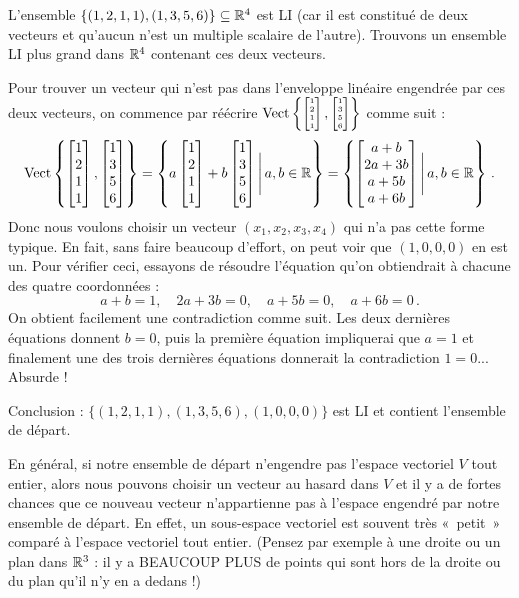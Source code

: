\begin{myexample} L'ensemble $\{(1,2,1,1), (1,3,5,6)\}\subseteq \mathbb{R}^4$ est LI (car il est constitué de deux vecteurs et qu'aucun n'est un multiple scalaire de l'autre).  Trouvons 
un ensemble LI plus grand dans $\mathbb{R}^4$ contenant ces deux vecteurs.

Pour trouver un vecteur qui n'est pas dans l'enveloppe lin\'eaire engendr\'ee par ces deux vecteurs, on commence par r\'e\'ecrire $\textrm{Vect}\tiny\left\{ \left[ \begin{matrix} 1\\2\\1\\1 \end{matrix} \right], \left[ \begin{matrix} 1\\3\\5\\6 \end{matrix} \right] \right\}$ comme suit :
$$
\textrm{Vect}\left\{ \left[ \begin{matrix} 1\\2\\1\\1 \end{matrix} \right], \left[ \begin{matrix} 1\\3\\5\\6 \end{matrix} \right] \right\} =
\left\{ a \left[ \begin{matrix} 1\\2\\1\\1 \end{matrix} \right]+b \left[ \begin{matrix} 1\\3\\5\\6 \end{matrix} \right] \Bigg|\, a,b \in \mathbb{R}\right\} 
= 
\left\{ \left[ \begin{matrix} a+b\\2a+3b\\a+5b\\a+6b \end{matrix} \right] \Bigg|\, a,b \in \mathbb{R}\right\}\,.
$$
Donc nous voulons choisir un vecteur $(x_1,x_2,x_3,x_4)$ qui
n'a pas cette forme typique.  En fait, sans faire beaucoup d'effort, on peut voir que $(1,0,0,0)$ en est un. 
Pour v\'erifier ceci, essayons de résoudre l'équation qu'on obtiendrait à chacune des quatre coordonnées :
$$
a+b=1,\quad  2a+3b=0,\quad a+5b=0,\quad a+6b=0\,.
$$
On obtient facilement une contradiction comme suit. Les deux dernières équations donnent $b=0$, puis la première équation impliquerai que $a=1$ et finalement une des trois derni\`eres équations donnerait la contradiction $1=0$... Absurde ! 

Conclusion : $\{(1,2,1,1), (1,3,5,6), (1,0,0,0)\}$ est LI et contient l'ensemble de départ.
\end{myexample}

\begin{remark} En général, si notre ensemble de départ n'engendre pas l'espace vectoriel $V$ tout entier, alors nous pouvons choisir un vecteur au hasard dans $V$ et
 il y a de fortes chances que ce nouveau vecteur n'appartienne pas
\`a l'espace engendr\'e par notre ensemble de départ. En effet, un sous-espace vectoriel est souvent très «~petit~» comparé à l'espace vectoriel tout entier. (Pensez par exemple à une droite ou un plan dans $\mathbb{R}^3$ :
il y a BEAUCOUP PLUS de points qui sont hors de la droite ou du plan qu'il n'y en a dedans !)
\end{remark}

